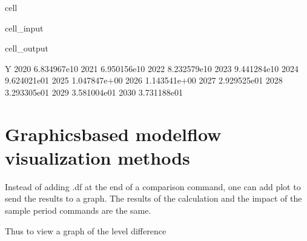 \documentclass[letterpaper,10pt,english]{jupyterBook}
\begin{document}
\begin{sphinxuseclass}{cell}\begin{sphinxVerbatimInput}

\begin{sphinxuseclass}{cell_input}
\begin{sphinxVerbatim}[commandchars=\\\{\}]
\PYG{p}{[}\PYG{p}{]}

\end{sphinxVerbatim}

\end{sphinxuseclass}\end{sphinxVerbatimInput}
\begin{sphinxVerbatimOutput}

\begin{sphinxuseclass}{cell_output}
\begin{sphinxVerbatim}[commandchars=\\\{\}]
                 Y
2020  6.834967e\PYGZhy{}10
2021  6.950156e\PYGZhy{}10
2022  8.232579e\PYGZhy{}10
2023  9.441284e\PYGZhy{}10
2024  9.624021e\PYGZhy{}01
2025  1.047847e+00
2026  1.143541e+00
2027  2.929525e\PYGZhy{}01
2028  3.293305e\PYGZhy{}01
2029  3.581004e\PYGZhy{}01
2030  3.731188e\PYGZhy{}01
\end{sphinxVerbatim}

\end{sphinxuseclass}\end{sphinxVerbatimOutput}

\end{sphinxuseclass}

\section{Graphics\sphinxhyphen{}based modelflow visualization methods}
\label{\detokenize{content/05_SimpleModel/SimpleModel:graphics-based-modelflow-visualization-methods}}
\sphinxAtStartPar
Instead of adding .df at the end of a comparison command, one can add plot to send the results to a graph.  The results of the calculation and the impact of the sample period commands are the same.

\sphinxAtStartPar
Thus to view a graph of the level difference
\end{document}

